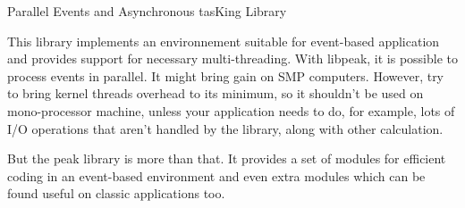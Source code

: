 Parallel Events and Asynchronous tas\-King Library

\begin{Desc}
\item[]This library implements an environnement suitable for event-based application and provides support for necessary multi-threading. With libpeak, it is possible to process events in parallel. It might bring gain on SMP computers. However, try to bring kernel threads overhead to its minimum, so it shouldn't be used on mono-processor machine, unless your application needs to do, for example, lots of I/O operations that aren't handled by the library, along with other calculation.\end{Desc}
\begin{Desc}
\item[]But the peak library is more than that. It provides a set of modules for efficient coding in an event-based environment and even extra modules which can be found useful on classic applications too.\end{Desc}
\begin{Desc}
\item[]\end{Desc}
